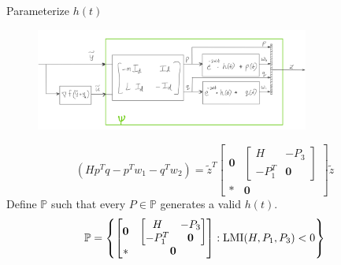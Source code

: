 \documentclass{beamer}
\begin{document}
\begin{frame}{Parameterize $h(t)$}
\begin{figure}[t]
	\includegraphics[width=9cm]{figures/signal_definitions.PNG}
	\centering
\end{figure}
\begin{equation*}
	( H p^T q - p^T w_1 - q^T w_2)=		
	\tilde{z}^T
	\begin{bmatrix}
		\mathbf{0}  & \begin{bmatrix}
			H  & -P_3 \\
			-P_1^T    & \mathbf{0}
		\end{bmatrix} \\
		*    & \mathbf{0}
	\end{bmatrix}\tilde{z}
\end{equation*}	
Define $\mathbb{P}$ such that every $P \in \mathbb{P}$ generates a valid $h(t)$.	
\begin{equation*}
	\mathbb{P}=\left\{
	\begin{bmatrix}
		\mathbf{0}  & \begin{bmatrix}
			H  & -P_3 \\
			-P_1^T    & \mathbf{0}
		\end{bmatrix} \\
		*    & \mathbf{0}
	\end{bmatrix}: \textnormal{LMI}(H,P_1,P_3)<0
	\right\}
\end{equation*}



\end{frame}
\end{document}
